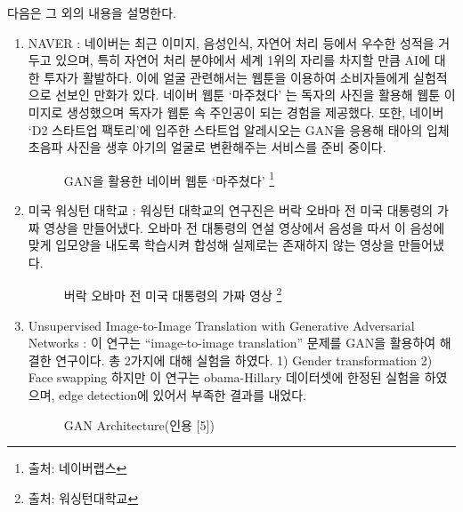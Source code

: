 다음은 그 외의 내용을 설명한다.
\begin{enumerate}%

\item NAVER : 네이버는 최근 이미지, 음성인식, 자연어 처리 등에서 우수한 성적을 거두고 있으며, 특히 자연어 처리 분야에서 세계 1위의 자리를 차지할 만큼 AI에 대한 투자가 활발하다. 이에 얼굴 관련해서는 웹툰을 이용하여 소비자들에게 실험적으로 선보인 만화가 있다. 네이버 웹툰 ‘마주쳤다’ 는 독자의 사진을 활용해 웹툰 이미지로 생성했으며 독자가 웹툰 속 주인공이 되는 경험을 제공했다. 또한, 네이버 ‘D2 스타트업 팩토리’에 입주한 스타트업 알레시오는 GAN을 응용해 태아의 입체 초음파 사진을 생후 아기의 얼굴로 변환해주는 서비스를 준비 중이다.

\begin{figure}[h!]
    \centering
    \caption{ GAN을 활용한 네이버 웹툰 ‘마주쳤다’ \protect\footnote{출처: 네이버랩스}}
\end{figure}


\item 미국 워싱턴 대학교 : 워싱턴 대학교의 연구진은 버락 오바마 전 미국 대통령의 가짜 영상을 만들어냈다. 오바마 전 대통령의 연설 영상에서 음성을 따서 이 음성에 맞게 입모양을 내도록 학습시켜 합성해 실제로는 존재하지 않는 영상을 만들어냈다. 

\begin{figure}[h!]
    \centering
    \caption{  버락 오바마 전 미국 대통령의 가짜 영상 \protect\footnote{출처: 워싱턴대학교}}
\end{figure}


\item Unsupervised Image-to-Image Translation with Generative Adversarial Networks : 이 연구는 “image-to-image translation” 문제를 GAN을 활용하여 해결한 연구이다. 총 2가지에 대해 실험을 하였다. 1) Gender transformation 2) Face swapping 하지만 이 연구는 obama-Hillary 데이터셋에 한정된 실험을 하였으며, edge detection에 있어서 부족한 결과를 내었다.

\begin{figure}[h!]
    \centering
    \caption{ GAN Architecture(인용 [5])}
\end{figure}

\end{enumerate}


